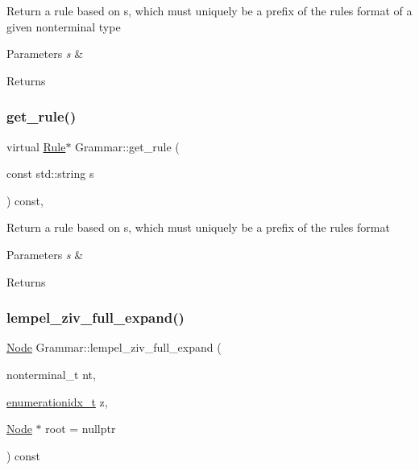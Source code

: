 Return a rule based on s, which must uniquely be a prefix of the rule\textquotesingle{}s format of a given nonterminal type 
\begin{DoxyParams}{Parameters}
{\em s} & \\
\hline
\end{DoxyParams}
\begin{DoxyReturn}{Returns}

\end{DoxyReturn}
\mbox{\label{class_grammar_adecdec03b3211bd3b6800511c7ed5dd9}} 
\subsubsection{\texorpdfstring{get\+\_\+rule()}{get\_rule()}\hspace{0.1cm}{\footnotesize\ttfamily [5/5]}}
{\footnotesize\ttfamily virtual \hyperlink{class_rule}{Rule}$\ast$ Grammar\+::get\+\_\+rule (\begin{DoxyParamCaption}\item[{const std\+::string}]{s }\end{DoxyParamCaption}) const\hspace{0.3cm}{\ttfamily [inline]}, {\ttfamily [virtual]}}

Return a rule based on s, which must uniquely be a prefix of the rule\textquotesingle{}s format 
\begin{DoxyParams}{Parameters}
{\em s} & \\
\hline
\end{DoxyParams}
\begin{DoxyReturn}{Returns}

\end{DoxyReturn}
\mbox{\label{class_grammar_a607aa205d57a1b61b07f9ef57adcf697}} 
\subsubsection{\texorpdfstring{lempel\+\_\+ziv\+\_\+full\+\_\+expand()}{lempel\_ziv\_full\_expand()}\hspace{0.1cm}{\footnotesize\ttfamily [1/2]}}
{\footnotesize\ttfamily \hyperlink{class_node}{Node} Grammar\+::lempel\+\_\+ziv\+\_\+full\+\_\+expand (\begin{DoxyParamCaption}\item[{nonterminal\+\_\+t}]{nt,  }\item[{\hyperlink{_numerics_8h_a9fe2bbca873b046b2bd276fc6856bb88}{enumerationidx\+\_\+t}}]{z,  }\item[{\hyperlink{class_node}{Node} $\ast$}]{root = {\ttfamily nullptr} }\end{DoxyParamCaption}) const\hspace{0.3cm}{\ttfamily [inline]}}

